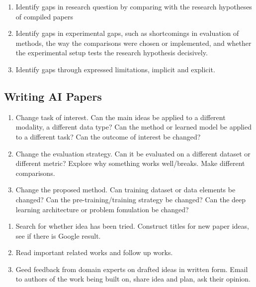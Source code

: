 \begin{remark} 
\begin{enumerate}[label=\roman*.]
\setlength{\itemsep}{0pt}
\item Identify gaps in research question by comparing with the research hypotheses of compiled papers
\item Identify gaps in experimental gaps, such as shortcomings in evaluation of methods, the way the comparisons were chosen or implemented, and whether the experimental setup tests the research hypothesis decisively.
\item Identify gaps through expressed limitations, implicit and explicit. 
\end{enumerate}
\end{remark}

\newpage

\subsection{Writing AI Papers}

\begin{remark} 
\begin{enumerate}[label=\roman*.]
\setlength{\itemsep}{0pt}
\item Change task of interest. Can the main ideas be applied to a different modality, a different data type? Can the method or learned model be applied to a different task? Can the outcome of interest be changed?
\item Change the evaluation strategy. Can it be evaluated on a different dataset or different metric? Explore why something works well/breaks. Make different comparisons.
\item Change the proposed method. Can training dataset or data elements be changed? Can the pre-training/training strategy be changed? Can the deep learning architecture or problem fomulation be changed?
\end{enumerate}
\end{remark}

\begin{remark} 
\begin{enumerate}[label=\roman*.]
\setlength{\itemsep}{0pt}
\item Search for whether idea has been tried. Construct titles for new paper ideas, see if there is Google result.
\item Read important related works and follow up works.
\item Geed feedback from domain experts on drafted ideas in written form. Email to authors of the work being built on, share idea and plan, ask their opinion. 
\end{enumerate}
\end{remark}


